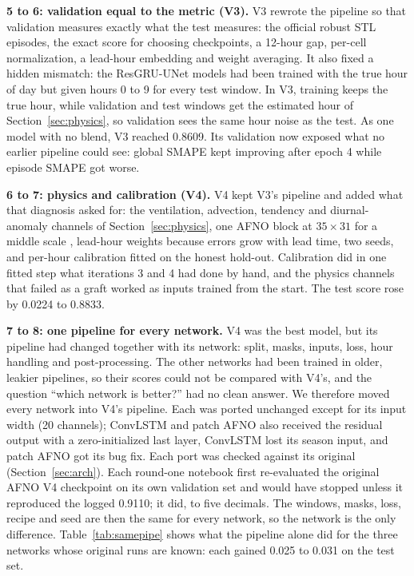 \documentclass[conference]{IEEEtran}
\begin{document}
\textbf{5 to 6: validation equal to the metric (V3).} V3 rewrote the pipeline so that validation measures exactly what the test measures: the official robust STL episodes, the exact score for choosing checkpoints, a 12-hour gap, per-cell normalization, a lead-hour embedding and weight averaging. It also fixed a hidden mismatch: the ResGRU-UNet models had been trained with the true hour of day but given hours 0 to 9 for every test window. In V3, training keeps the true hour, while validation and test windows get the estimated hour of Section~\ref{sec:physics}, so validation sees the same hour noise as the test. As one model with no blend, V3 reached 0.8609. Its validation now exposed what no earlier pipeline could see: global SMAPE kept improving after epoch 4 while episode SMAPE got worse.

\textbf{6 to 7: physics and calibration (V4).} V4 kept V3's pipeline and added what that diagnosis asked for: the ventilation, advection, tendency and diurnal-anomaly channels of Section~\ref{sec:physics}, one AFNO block at $35\times31$ for a middle scale \cite{dang2025adaptfno}, lead-hour weights because errors grow with lead time, two seeds, and per-hour calibration fitted on the honest hold-out. Calibration did in one fitted step what iterations 3 and 4 had done by hand, and the physics channels that failed as a graft worked as inputs trained from the start. The test score rose by 0.0224 to 0.8833.

\textbf{7 to 8: one pipeline for every network.} V4 was the best model, but its pipeline had changed together with its network: split, masks, inputs, loss, hour handling and post-processing. The other networks had been trained in older, leakier pipelines, so their scores could not be compared with V4's, and the question ``which network is better?'' had no clean answer. We therefore moved every network into V4's pipeline. Each was ported unchanged except for its input width (20 channels); ConvLSTM and patch AFNO also received the residual output with a zero-initialized last layer, ConvLSTM lost its season input, and patch AFNO got its bug fix. Each port was checked against its original (Section~\ref{sec:arch}). Each round-one notebook first re-evaluated the original AFNO V4 checkpoint on its own validation set and would have stopped unless it reproduced the logged 0.9110; it did, to five decimals. The windows, masks, loss, recipe and seed are then the same for every network, so the network is the only difference. Table~\ref{tab:samepipe} shows what the pipeline alone did for the three networks whose original runs are known: each gained 0.025 to 0.031 on the test set.
\end{document}
